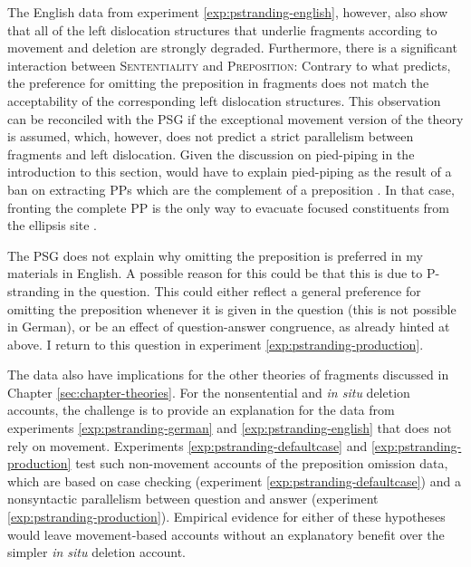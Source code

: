 The English data from experiment \ref{exp:pstranding-english}, however, also show that all of the left dislocation structures that underlie fragments according to movement and deletion are strongly degraded. Furthermore, there is a significant interaction between \textsc{Sententiality} and \textsc{Preposition}: Contrary to what \citet{merchant2004} predicts, the preference for omitting the preposition in fragments does not match the acceptability of the corresponding left dislocation structures. This observation can be reconciled with the PSG if the exceptional movement version of the theory \citep{weir2014} is assumed, which, however, does not predict a strict parallelism between fragments and left dislocation. Given the discussion on pied-piping in the introduction to this section, \citet{weir2014} would have to explain pied-piping as the result of a ban on extracting PPs which are the complement of a preposition \citep{abels2003, abels2012}. In that case, fronting the complete PP is the only way to evacuate focused constituents from the ellipsis site \citep{heck2008}.

The PSG does not explain why omitting the preposition is preferred in my materials in English. A possible reason for this could be that this is due to P-stranding in the question. This could either reflect a general preference for omitting the preposition whenever it is given in the question (this is not possible in German), or be an effect of question-answer congruence, as already hinted at above. I return to this question in experiment \ref{exp:pstranding-production}.

The data also have implications for the other theories of fragments discussed in Chapter \ref{sec:chapter-theories}. For the nonsentential and \textit{in situ} deletion accounts, the challenge is to provide an explanation for the data from experiments \ref{exp:pstranding-german} and \ref{exp:pstranding-english} that does not rely on movement. Experiments \ref{exp:pstranding-defaultcase} and \ref{exp:pstranding-production} test such non-movement accounts of the preposition omission data, which are based on case checking (experiment \ref{exp:pstranding-defaultcase}) and a nonsyntactic parallelism between question and answer (experiment \ref{exp:pstranding-production}). Empirical evidence for either of these hypotheses would leave movement-based accounts without an explanatory benefit over the simpler \textit{in situ} deletion account.

